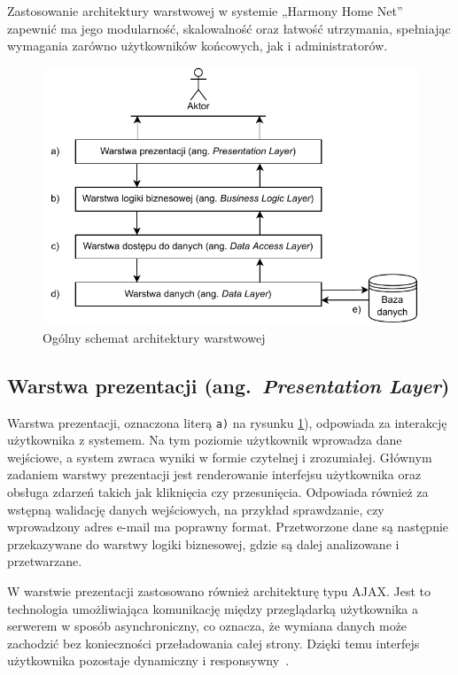 Zastosowanie architektury warstwowej w systemie „Harmony Home Net” zapewnić ma jego modularność, skalowalność oraz łatwość utrzymania, spełniając wymagania zarówno użytkowników końcowych, jak i administratorów.
\begin{figure}[htb]
    \centering
    \includegraphics[scale=1.2]{rys03/diagram_architektury_warstwowej}
    \caption{Ogólny schemat architektury warstwowej}
    \label{fig:n_tier_arch}
\end{figure}

\subsection{Warstwa prezentacji (ang.\ \emph{Presentation Layer})}
Warstwa prezentacji, oznaczona literą \texttt{a)} na rysunku \ref{fig:n_tier_arch}), odpowiada za interakcję użytkownika z systemem. Na tym poziomie użytkownik wprowadza dane wejściowe, a system zwraca wyniki w formie czytelnej i zrozumiałej. Głównym zadaniem warstwy prezentacji jest renderowanie interfejsu użytkownika oraz obsługa zdarzeń takich jak kliknięcia czy przesunięcia. Odpowiada również za wstępną walidację danych wejściowych, na przykład sprawdzanie, czy wprowadzony adres e-mail ma poprawny format. Przetworzone dane są następnie przekazywane do warstwy logiki biznesowej, gdzie są dalej analizowane i przetwarzane.

W warstwie prezentacji zastosowano również architekturę typu AJAX. Jest to technologia umożliwiająca komunikację między przeglądarką użytkownika a serwerem w sposób asynchroniczny, co oznacza, że wymiana danych może zachodzić bez konieczności przeładowania całej strony. Dzięki temu interfejs użytkownika pozostaje dynamiczny i responsywny~\cite{ajax}.

